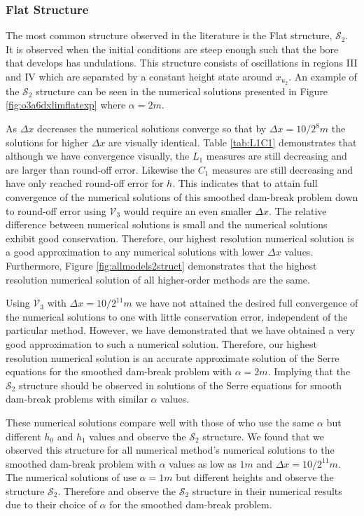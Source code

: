 \documentclass[times]{elsarticle}
\begin{document}
\subsubsection{Flat Structure}
The most common structure observed in the literature \cite{Hank-etal-2010-2034,Mitsotakis-etal-2014,Mitsotakis-etal-2017} is the Flat structure, $\mathcal{S}_2$. It is observed when the initial conditions are steep enough such that the bore that develops has undulations. This structure consists of oscillations in regions III and IV which are separated by a constant height state around $x_{u_2}$. An example of the $\mathcal{S}_2$ structure can be seen in the numerical solutions presented in Figure \ref{fig:o3a6dxlimflatexp} where $\alpha = 2m$.

As $\Delta x$ decreases the numerical solutions converge so that by $\Delta x = 10 / 2^8m$ the solutions for higher $\Delta x$ are visually identical. Table \ref{tab:L1C1} demonstrates that although we have convergence visually, the $L_1$ measures are still decreasing and are larger than round-off error. Likewise the $C_1$ measures are still decreasing and have only reached round-off error for $h$. This indicates that to attain full convergence of the numerical solutions of this smoothed dam-break problem down to round-off error using $\mathcal{V}_3$ would require an even smaller $\Delta x$. The relative difference between numerical solutions is small and the numerical solutions exhibit good conservation. Therefore, our highest resolution numerical solution is a good approximation to any numerical solutions with lower $\Delta x$ values. Furthermore, Figure \ref{fig:allmodels2struct} demonstrates that the highest resolution numerical solution of all higher-order methods are the same.

Using $\mathcal{V}_3$ with $\Delta x = 10 / 2^{11}m$ we have not attained the desired full convergence of the numerical solutions to one with little conservation error, independent of the particular method. However, we have demonstrated that we have obtained a very good approximation to such a numerical solution. Therefore, our highest resolution numerical solution is an accurate approximate solution of the Serre equations for the smoothed dam-break problem with $\alpha = 2m$. Implying that the $\mathcal{S}_2$ structure should be observed in solutions of the Serre equations for smooth dam-break problems with similar $\alpha$ values.

These numerical solutions compare well with those of \citet{Mitsotakis-etal-2014} who use the same $\alpha$ but different $h_0$ and $h_1$ values and observe the $\mathcal{S}_2$ structure. We found that we observed this structure for all numerical method's numerical solutions to the smoothed dam-break problem with $\alpha$ values as low as $1m$ and $\Delta x = 10/2^{11}m$. The numerical solutions of \citet{Mitsotakis-etal-2017} use $\alpha=1m$ but different heights and observe the structure $\mathcal{S}_2$. Therefore \citet{Mitsotakis-etal-2014} and \citet{Mitsotakis-etal-2017} observe the $\mathcal{S}_2$ structure in their numerical results due to their choice of $\alpha$ for the smoothed dam-break problem. 
\end{document}
